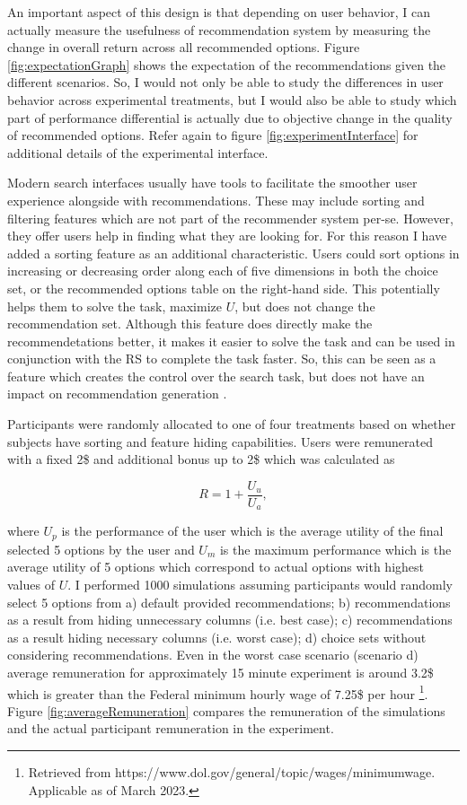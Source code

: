 \documentclass[a4paper,12pt]{article}
\begin{document}
An important aspect of this design is that depending on user behavior, I can actually measure the usefulness of recommendation system by measuring the change in overall return across all recommended options. Figure \ref{fig:expectationGraph} shows the expectation of the recommendations given the different scenarios. So, I would not only be able to study the differences in user behavior across experimental treatments, but I would also be able to study which part of performance differential is actually due to objective change in the quality of recommended options. Refer again to figure \ref{fig:experimentInterface} for additional details of the experimental interface.

Modern search interfaces usually have tools to facilitate the smoother user experience alongside with recommendations. These may include sorting and filtering features which are not part of the recommender system per-se. However, they offer users help in finding what they are looking for. For this reason I have added a sorting feature as an additional characteristic. Users could sort options in increasing or decreasing order along each of five dimensions in both the choice set, or the recommended options table on the right-hand side. This potentially helps them to solve the task, maximize $U$, but does not change the recommendation set. Although this feature does directly make the recommendetations better, it makes it easier to solve the task and can be used in conjunction with the RS to complete the task faster. So, this can be seen as a feature which creates the control over the search task, but does not have an impact on recommendation generation \citep{jannach2017user}. 

Participants were randomly allocated to one of four treatments based on whether subjects have sorting and feature hiding capabilities. Users were remunerated with a fixed 2\$ and additional bonus up to 2\$ which was calculated as 

$$R = 1 + \frac{U_u}{U_a} ,$$

where $U_p$ is the performance of the user which is the average utility of the final selected 5 options by the user and $U_m$ is the maximum performance which is the average utility of 5 options which correspond to actual options with highest values of $U$. I performed 1000 simulations assuming participants would randomly select 5 options from a) default provided recommendations; b) recommendations as a result from hiding unnecessary columns (i.e. best case); c) recommendations as a result hiding necessary columns (i.e. worst case); d) choice sets without considering recommendations. Even in the worst case scenario (scenario d) average remuneration for approximately 15 minute experiment is around 3.2\$ which is greater than the Federal minimum hourly wage  of 7.25\$ per hour \footnote{Retrieved from https://www.dol.gov/general/topic/wages/minimumwage. Applicable as of March 2023.}. Figure \ref{fig:averageRemuneration} compares the remuneration of the simulations and the actual participant remuneration in the experiment.
\end{document}
